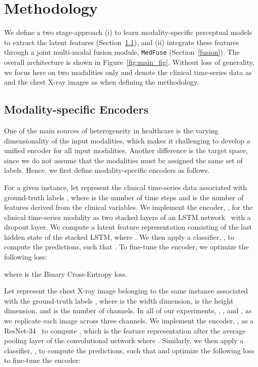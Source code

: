 \documentclass[pmlr]{jmlr}
\begin{document}
\vspace{-0.5mm}
\section{Methodology}
\label{sec:method}


We define a two stage-approach (i) to learn modality-specific perceptual models to extract the latent features (Section~\ref{encoders}), and (ii) integrate these features through a joint multi-modal fusion module, \texttt{MedFuse} (Section~\ref{fusion}). The overall architecture is shown in Figure~\ref{fig:main_fig}. Without loss of generality, we focus here on two modalities only and denote the clinical time-series data as  and the chest X-ray images as  when defining the methodology.


\subsection{Modality-specific Encoders} \label{encoders}
One of the main sources of heterogeneity in healthcare is the varying dimensionality of the input modalities, which makes it challenging to develop a unified encoder for all input modalities. Another difference is the target space, since we do not assume that the modalities must be assigned the same set of labels. Hence, we first define modality-specific encoders as follows. 


For a given instance, let  represent the clinical time-series data associated with ground-truth labels , where  is the number of time steps and  is the number of features derived from the clinical variables. We implement the encoder, , for the clinical time-series modality as two stacked layers of an LSTM network~\citep{hochreiter1997long} with a dropout layer. We compute a latent feature representation  consisting of the last hidden state of the stacked LSTM, where . We then apply a classifier, , to compute the predictions, such that . To fine-tune the encoder, we optimize the following loss:

where  is the Binary Cross-Entropy loss. 

Let  represent the chest X-ray image belonging to the same instance associated with the ground-truth labels , where  is the width dimension,  is the height dimension, and  is the number of channels. In all of our experiments, , , and , as we replicate each image across three channels. We implement the encoder, , as a ResNet-34~\citep{he2016deep} to compute , which is the feature representation after the average pooling layer of the convolutional network where . Similarly, we then apply a classifier, ,  to compute the predictions, such that  and optimize the following loss to fine-tune the encoder:
\end{document}
